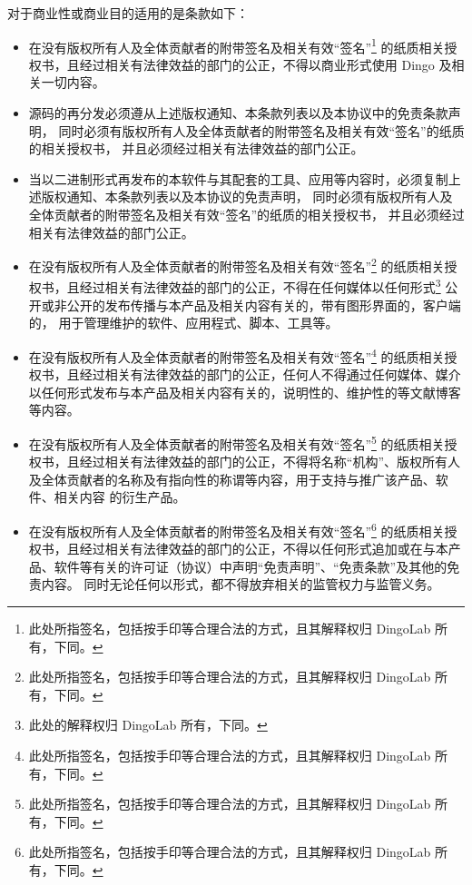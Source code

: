   对于商业性或商业目的适用的是条款如下：
  \begin{itemize}
    \item 在没有版权所有人及全体贡献者的附带签名及相关有效“签名”\footnote{此处所指签名，包括按手印等合理合法的方式，且其解释权归 DingoLab 所有，下同。}
      的纸质相关授权书，且经过相关有法律效益的部门的公正，不得以商业形式使用 Dingo 及相关一切内容。
    \item 源码的再分发必须遵从上述版权通知、本条款列表以及本协议中的免责条款声明，
      同时必须有版权所有人及全体贡献者的附带签名及相关有效“签名”的纸质的相关授权书，
      并且必须经过相关有法律效益的部门公正。
    \item 当以二进制形式再发布的本软件与其配套的工具、应用等内容时，必须复制上述版权通知、本条款列表以及本协议的免责声明，
      同时必须有版权所有人及全体贡献者的附带签名及相关有效“签名”的纸质的相关授权书，
      并且必须经过相关有法律效益的部门公正。
    \item 在没有版权所有人及全体贡献者的附带签名及相关有效“签名”\footnote{此处所指签名，包括按手印等合理合法的方式，且其解释权归 DingoLab 所有，下同。}
      的纸质相关授权书，且经过相关有法律效益的部门的公正，不得在任何媒体以任何形式\footnote{此处的解释权归 DingoLab 所有，下同。}
      公开或非公开的发布传播与本产品及相关内容有关的，带有图形界面的，客户端的，
      用于管理维护的软件、应用程式、脚本、工具等。
    \item 在没有版权所有人及全体贡献者的附带签名及相关有效“签名”\footnote{此处所指签名，包括按手印等合理合法的方式，且其解释权归 DingoLab 所有，下同。}
      的纸质相关授权书，且经过相关有法律效益的部门的公正，任何人不得通过任何媒体、媒介以任何形式发布与本产品及相关内容有关的，说明性的、维护性的等文献博客等内容。
    \item 在没有版权所有人及全体贡献者的附带签名及相关有效“签名”\footnote{此处所指签名，包括按手印等合理合法的方式，且其解释权归 DingoLab 所有，下同。}
      的纸质相关授权书，且经过相关有法律效益的部门的公正，不得将名称“机构”、版权所有人及全体贡献者的名称及有指向性的称谓等内容，用于支持与推广该产品、软件、相关内容
      的衍生产品。
    \item 在没有版权所有人及全体贡献者的附带签名及相关有效“签名”\footnote{此处所指签名，包括按手印等合理合法的方式，且其解释权归 DingoLab 所有，下同。}
      的纸质相关授权书，且经过相关有法律效益的部门的公正，不得以任何形式追加或在与本产品、软件等有关的许可证（协议）中声明“免责声明”、“免责条款”及其他的免责内容。
      同时无论任何以形式，都不得放弃相关的监管权力与监管义务。
  \end{itemize}

